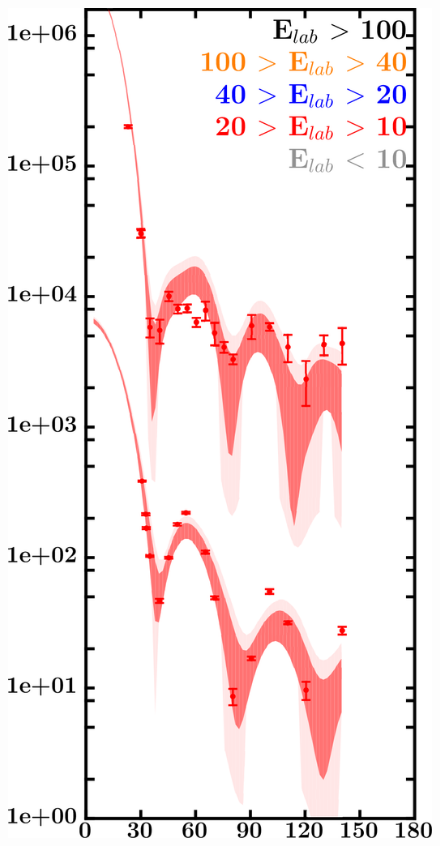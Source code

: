 \documentclass[twocolumn,secnumarabic,amssymb, nobibnotes, aps, prl,
superscriptaddress, nobalancelastpage]{revtex4}
\begin{document}
\begin{figure}[!htb]
    \begin{minipage}{0.4\linewidth}
        \centering
        \includegraphics[width=\linewidth]{figures/sn112_neutronElastic.png}
        \label{DOM_sn112_neutron_elastic}
    \end{minipage}
    \centering
    \begin{minipage}{0.4\linewidth}

\end{minipage}
\end{figure}
\end{document}
